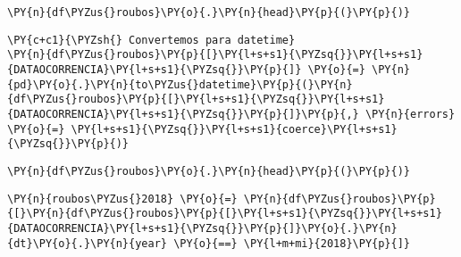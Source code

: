     \begin{tcolorbox}[breakable, size=fbox, boxrule=1pt, pad at break*=1mm,colback=cellbackground, colframe=cellborder]
\begin{Verbatim}[commandchars=\\\{\}]
\PY{n}{df\PYZus{}roubos}\PY{o}{.}\PY{n}{head}\PY{p}{(}\PY{p}{)}
\end{Verbatim}
\end{tcolorbox}

    \begin{tcolorbox}[breakable, size=fbox, boxrule=1pt, pad at break*=1mm,colback=cellbackground, colframe=cellborder]
\begin{Verbatim}[commandchars=\\\{\}]
\PY{c+c1}{\PYZsh{} Convertemos para datetime}
\PY{n}{df\PYZus{}roubos}\PY{p}{[}\PY{l+s+s1}{\PYZsq{}}\PY{l+s+s1}{DATAOCORRENCIA}\PY{l+s+s1}{\PYZsq{}}\PY{p}{]} \PY{o}{=} \PY{n}{pd}\PY{o}{.}\PY{n}{to\PYZus{}datetime}\PY{p}{(}\PY{n}{df\PYZus{}roubos}\PY{p}{[}\PY{l+s+s1}{\PYZsq{}}\PY{l+s+s1}{DATAOCORRENCIA}\PY{l+s+s1}{\PYZsq{}}\PY{p}{]}\PY{p}{,} \PY{n}{errors} \PY{o}{=} \PY{l+s+s1}{\PYZsq{}}\PY{l+s+s1}{coerce}\PY{l+s+s1}{\PYZsq{}}\PY{p}{)}
\end{Verbatim}
\end{tcolorbox}

    \begin{tcolorbox}[breakable, size=fbox, boxrule=1pt, pad at break*=1mm,colback=cellbackground, colframe=cellborder]
\begin{Verbatim}[commandchars=\\\{\}]
\PY{n}{df\PYZus{}roubos}\PY{o}{.}\PY{n}{head}\PY{p}{(}\PY{p}{)}
\end{Verbatim}
\end{tcolorbox}

    \begin{tcolorbox}[breakable, size=fbox, boxrule=1pt, pad at break*=1mm,colback=cellbackground, colframe=cellborder]
\begin{Verbatim}[commandchars=\\\{\}]
\PY{n}{roubos\PYZus{}2018} \PY{o}{=} \PY{n}{df\PYZus{}roubos}\PY{p}{[}\PY{n}{df\PYZus{}roubos}\PY{p}{[}\PY{l+s+s1}{\PYZsq{}}\PY{l+s+s1}{DATAOCORRENCIA}\PY{l+s+s1}{\PYZsq{}}\PY{p}{]}\PY{o}{.}\PY{n}{dt}\PY{o}{.}\PY{n}{year} \PY{o}{==} \PY{l+m+mi}{2018}\PY{p}{]}
\end{Verbatim}
\end{tcolorbox}

